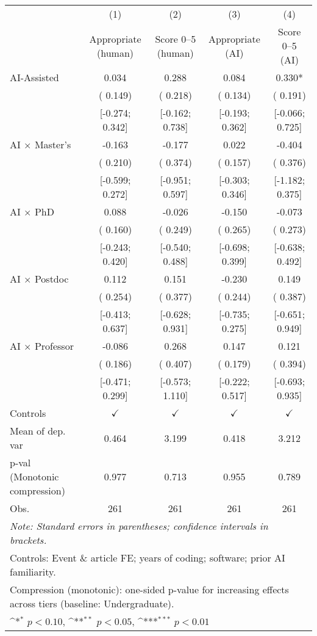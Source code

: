 \def\sym#1{\ifmmode^{#1}\else\(^{#1}\)\fi}
\begin{tabular}{l*{4}{c}}
\hline\hline
 & (1) & (2) & (3) & (4)
\\
 & Appropriate (human) & Score 0–5 (human) & Appropriate (AI) & Score 0–5 (AI)
 \\
\hline
AI-Assisted &  0.034 &  0.288 &  0.084 &  0.330*
\\
 & ( 0.149) & ( 0.218) & ( 0.134) & ( 0.191)
\\
 & [-0.274;  0.342] & [-0.162;  0.738] & [-0.193;  0.362] & [-0.066;  0.725]
\\
AI × Master's & -0.163 & -0.177 &  0.022 & -0.404
\\
 & ( 0.210) & ( 0.374) & ( 0.157) & ( 0.376)
\\
 & [-0.599;  0.272] & [-0.951;  0.597] & [-0.303;  0.346] & [-1.182;  0.375]
\\
AI × PhD &  0.088 & -0.026 & -0.150 & -0.073
\\
 & ( 0.160) & ( 0.249) & ( 0.265) & ( 0.273)
\\
 & [-0.243;  0.420] & [-0.540;  0.488] & [-0.698;  0.399] & [-0.638;  0.492]
\\
AI × Postdoc &  0.112 &  0.151 & -0.230 &  0.149
\\
 & ( 0.254) & ( 0.377) & ( 0.244) & ( 0.387)
\\
 & [-0.413;  0.637] & [-0.628;  0.931] & [-0.735;  0.275] & [-0.651;  0.949]
\\
AI × Professor & -0.086 &  0.268 &  0.147 &  0.121
\\
 & ( 0.186) & ( 0.407) & ( 0.179) & ( 0.394)
\\
 & [-0.471;  0.299] & [-0.573;  1.110] & [-0.222;  0.517] & [-0.693;  0.935]
\\
\hline
Controls & $\checkmark$ & $\checkmark$ & $\checkmark$ & $\checkmark$
\\
Mean of dep. var &  0.464 &  3.199 &  0.418 &  3.212
\\
p-val (Monotonic compression) &  0.977 &  0.713 &  0.955 &  0.789
\\
Obs. & 261 & 261 & 261 & 261
\\
\hline
\hline\hline
\multicolumn{5}{l}{\it{Note:} Standard errors in parentheses; confidence intervals in brackets.}\\
\multicolumn{5}{l}{Controls: Event \& article FE; years of coding; software; prior AI familiarity.}\\
\multicolumn{5}{l}{Compression (monotonic): one-sided p-value for increasing effects across tiers (baseline: Undergraduate).}\\
\multicolumn{5}{l}{\sym{*} $p<0.10$, \sym{**} $p<0.05$,  \sym{***} $p<0.01$}\\
\end{tabular}

